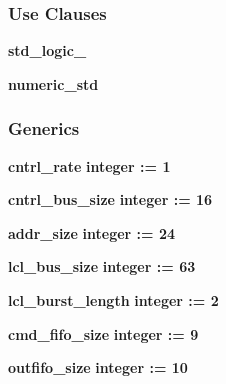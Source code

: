 \subsubsection*{Use Clauses}
 \begin{DoxyCompactItemize}
\item 
{\bf std\+\_\+logic\+\_}   
\item 
{\bf numeric\+\_\+std}   
\end{DoxyCompactItemize}
\subsubsection*{Generics}
 \begin{DoxyCompactItemize}
\item 
{\bf cntrl\+\_\+rate} {\bfseries {\bfseries \textcolor{comment}{integer}\textcolor{vhdlchar}{ }\textcolor{vhdlchar}{ }\textcolor{vhdlchar}{\+:}\textcolor{vhdlchar}{=}\textcolor{vhdlchar}{ }\textcolor{vhdlchar}{ } \textcolor{vhdldigit}{1} \textcolor{vhdlchar}{ }}}
\item 
{\bf cntrl\+\_\+bus\+\_\+size} {\bfseries {\bfseries \textcolor{comment}{integer}\textcolor{vhdlchar}{ }\textcolor{vhdlchar}{ }\textcolor{vhdlchar}{\+:}\textcolor{vhdlchar}{=}\textcolor{vhdlchar}{ }\textcolor{vhdlchar}{ } \textcolor{vhdldigit}{16} \textcolor{vhdlchar}{ }}}
\item 
{\bf addr\+\_\+size} {\bfseries {\bfseries \textcolor{comment}{integer}\textcolor{vhdlchar}{ }\textcolor{vhdlchar}{ }\textcolor{vhdlchar}{\+:}\textcolor{vhdlchar}{=}\textcolor{vhdlchar}{ }\textcolor{vhdlchar}{ } \textcolor{vhdldigit}{24} \textcolor{vhdlchar}{ }}}
\item 
{\bf lcl\+\_\+bus\+\_\+size} {\bfseries {\bfseries \textcolor{comment}{integer}\textcolor{vhdlchar}{ }\textcolor{vhdlchar}{ }\textcolor{vhdlchar}{\+:}\textcolor{vhdlchar}{=}\textcolor{vhdlchar}{ }\textcolor{vhdlchar}{ } \textcolor{vhdldigit}{63} \textcolor{vhdlchar}{ }}}
\item 
{\bf lcl\+\_\+burst\+\_\+length} {\bfseries {\bfseries \textcolor{comment}{integer}\textcolor{vhdlchar}{ }\textcolor{vhdlchar}{ }\textcolor{vhdlchar}{\+:}\textcolor{vhdlchar}{=}\textcolor{vhdlchar}{ }\textcolor{vhdlchar}{ } \textcolor{vhdldigit}{2} \textcolor{vhdlchar}{ }}}
\item 
{\bf cmd\+\_\+fifo\+\_\+size} {\bfseries {\bfseries \textcolor{comment}{integer}\textcolor{vhdlchar}{ }\textcolor{vhdlchar}{ }\textcolor{vhdlchar}{\+:}\textcolor{vhdlchar}{=}\textcolor{vhdlchar}{ }\textcolor{vhdlchar}{ } \textcolor{vhdldigit}{9} \textcolor{vhdlchar}{ }}}
\item 
{\bf outfifo\+\_\+size} {\bfseries {\bfseries \textcolor{comment}{integer}\textcolor{vhdlchar}{ }\textcolor{vhdlchar}{ }\textcolor{vhdlchar}{\+:}\textcolor{vhdlchar}{=}\textcolor{vhdlchar}{ }\textcolor{vhdlchar}{ } \textcolor{vhdldigit}{10} \textcolor{vhdlchar}{ }}}
\end{DoxyCompactItemize}
